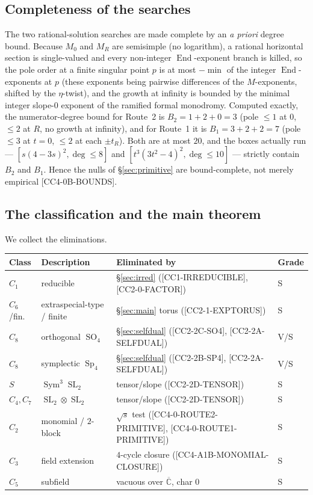 \documentclass[11pt,reqno]{amsart}
\theoremstyle{plain}
\theoremstyle{definition}
\theoremstyle{remark}
\newcommand{\C}{\mathbb{C}}
\newcommand{\SL}{\operatorname{SL}}
\newcommand{\Sp}{\operatorname{Sp}}
\newcommand{\SO}{\operatorname{SO}}
\newcommand{\Sym}{\operatorname{Sym}}
\newcommand{\End}{\operatorname{End}}
\newcommand{\claim}[1]{\textsf{\small[#1]}}
\begin{document}
\subsection{Completeness of the searches}\label{sec:bounds}
The two rational-solution searches are made complete by an \emph{a priori}
degree bound. Because $M_{0}$ and $M_{R}$ are semisimple (no logarithm), a
rational horizontal section is single-valued and every non-integer
$\End$-exponent branch is killed, so the pole order at a finite singular point
$p$ is at most $-\min$ of the integer $\End$-exponents at $p$ (these exponents
being pairwise differences of the $M$-exponents, shifted by the $\eta$-twist),
and the growth at infinity is bounded by the minimal integer slope-$0$ exponent
of the ramified formal monodromy. Computed exactly, the numerator-degree bound
for Route~2 is $B_{2}=1+2+0=3$ (pole $\le1$ at $0$, $\le2$ at $R$, no growth at
infinity), and for Route~1 it is $B_{1}=3+2+2=7$ (pole $\le3$ at $t=0$, $\le2$
at each $\pm t_{R}$). Both are at most $20$, and the boxes actually run ---
$[s(4-3s)^{2},\deg\le8]$ and $[t^{3}(3t^{2}-4)^{2},\deg\le10]$ --- strictly
contain $B_{2}$ and $B_{1}$. Hence the nulls of \S\ref{sec:primitive} are
bound-complete, not merely empirical \claim{CC4-0B-BOUNDS}.

\subsection{The classification and the main theorem}
\label{sec:asch}
We collect the eliminations.

\begin{center}
\small
\begin{tabular}{@{}ll>{\raggedright\arraybackslash}p{}l@{}}
\toprule
Class & Description & Eliminated by & Grade \\
\midrule
$C_{1}$ & reducible & \S\ref{sec:irred} (\claim{CC1-IRREDUCIBLE},
  \claim{CC2-0-FACTOR}) & S \\
$C_{6}$/fin. & extraspecial-type / finite & \S\ref{sec:main} torus (\claim{CC2-1-EXPTORUS}) & S \\
$C_{8}$ & orthogonal $\SO_{4}$ & \S\ref{sec:selfdual} (\claim{CC2-2C-SO4},
  \claim{CC2-2A-SELFDUAL}) & V/S \\
$C_{8}$ & symplectic $\Sp_{4}$ & \S\ref{sec:selfdual} (\claim{CC2-2B-SP4},
  \claim{CC2-2A-SELFDUAL}) & V/S \\
$S$ & $\Sym^{3}\SL_{2}$ & tensor/slope (\claim{CC2-2D-TENSOR}) & S \\
$C_{4},C_{7}$ & $\SL_{2}\otimes\SL_{2}$ & tensor/slope (\claim{CC2-2D-TENSOR}) & S \\
$C_{2}$ & monomial / $2$-block & $\sqrt{s}$ test (\claim{CC4-0-ROUTE2-PRIMITIVE},
  \claim{CC4-0-ROUTE1-PRIMITIVE}) & S \\
$C_{3}$ & field extension & $4$-cycle closure (\claim{CC4-A1B-MONOMIAL-CLOSURE})
  & S \\
$C_{5}$ & subfield & vacuous over $\overline{\C}$, char $0$ & S \\
\bottomrule
\end{tabular}
\end{center}
\end{document}

